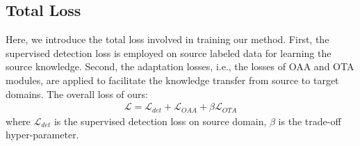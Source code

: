\documentclass[sigconf]{acmart}
\begin{document}
\subsection{Total Loss}
Here, we introduce the total loss involved in training our method. First, the supervised detection loss is employed on source labeled data for learning the source knowledge. Second, the adaptation losses, i.e., the losses of OAA and OTA modules, are applied to facilitate the knowledge transfer from source to target domains. The overall loss of ours:
\begin{align}
    \mathcal{L} = \mathcal{L}_{det} + \mathcal{L}_{OAA} + \beta \mathcal{L}_{OTA}
\end{align}where $\mathcal{L}_{det}$ is the supervised detection loss on source domain, $\beta$ is the trade-off hyper-parameter. 
\end{document}
